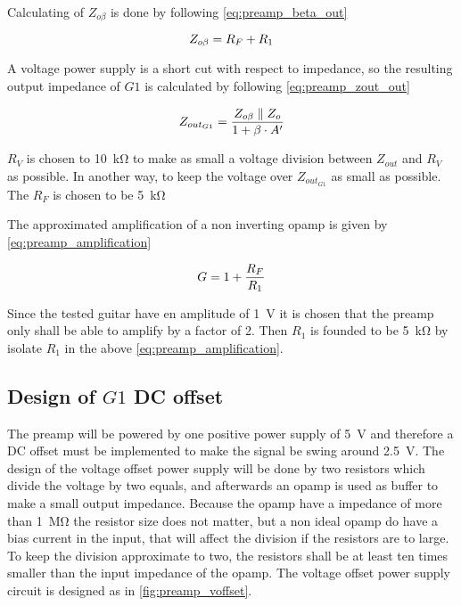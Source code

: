 Calculating of $Z_{o\beta}$ is done by following \autoref{eq:preamp_beta_out}

\begin{equation}\label{eq:preamp_beta_out}
        Z_{o\beta} = R_F+R_1
        \addunit{\si{\ohm}}
    \end{equation}

A voltage power supply is a short cut with respect to impedance, so the resulting output impedance of $G1$ is calculated by following \autoref{eq:preamp_zout_out} 

\begin{equation}\label{eq:preamp_zout_out}
        Z_{out_{G1}} = \frac{ Z_{o\beta} \parallel Z_{o} }{1+\beta \cdot A'}
        \addunit{\si{\ohm}}
    \end{equation}
    \startexplain
    \stopexplain

$R_V$ is chosen to \SI{10}{\kilo\ohm} to make as small a voltage division between $Z_{out}$ and $R_V$ as possible. In another way, to keep the voltage over $Z_{out_{G1}}$ as small as possible. The $R_F$ is chosen to be \SI{5}{\kilo\ohm} 


The approximated amplification of a non inverting \gls{opamp} is given by \autoref{eq:preamp_amplification}

\begin{equation}\label{eq:preamp_amplification}
        G =1+\frac{R_F}{R_1}
        \addunit{\si{1}}
    \end{equation}

    \startexplain
    \stopexplain

Since the tested guitar have en amplitude of \SI{1}{\volt} it is chosen that the \gls{preamp} only shall be able to amplify by a factor of 2. Then  $R_1$ is founded to be \SI{5}{\kilo\ohm} by isolate $R_1$ in the above \autoref{eq:preamp_amplification}.
 
   
\subsection{Design of $G1$ DC offset}
The \gls{preamp} will be powered by one positive power supply of \SI{5}{\volt} and therefore a DC offset must be implemented to make the signal be swing around \SI{2.5}{\volt}. 
The design of the voltage offset power supply will be done by two resistors which divide the voltage by two equals, and afterwards an \gls{opamp} is used as buffer  to make a small output impedance. Because the \gls{opamp} have a impedance of more than \SI{1}{\mega\ohm} the resistor size does not matter, but a non ideal \gls{opamp} do have a bias current in the input, that will affect the division if the resistors are to large. To keep the division approximate to two, the resistors shall be at least ten times smaller than the input impedance of the \gls{opamp}. The voltage offset power supply circuit is designed as in \autoref{fig:preamp_voffset}.
    
